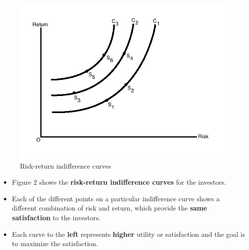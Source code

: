 \documentclass{beamer}
\begin{document}
\begin{frame}

\begin{figure}
	\centering
	\includegraphics[scale = 0.25]{fig2.jpg}
	\vskip -0.6cm
	\caption{Risk-return indifference curves}
	\label{fig:fig2}
\end{figure}

\vskip -0.2cm
\justifying
\begin{itemize}
	\justifying
	\item Figure $2$ shows the \textbf{risk-return indifference curves} for the investors.
	\item Each of the different points on a particular indifference curve shows a different combination of risk and return, which provide the \textbf{same satisfaction} to the investors.
	\item Each curve to the \textbf{left} represents \textbf{higher} utility or satisfaction and the goal is to maximize the satisfaction.
\end{itemize}

\end{frame}
\end{document}
